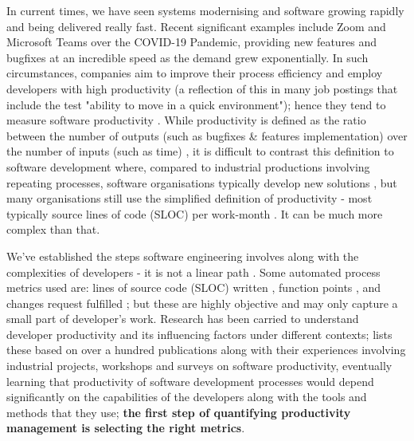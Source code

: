 \documentclass{mprop}
\begin{document}
In current times, we have seen systems modernising and software growing rapidly and being delivered really fast. Recent significant examples include Zoom and Microsoft Teams over the COVID-19 Pandemic, providing new features and bugfixes at an incredible speed as the demand grew exponentially. In such circumstances, companies aim to improve their process efficiency and employ developers with high productivity (a reflection of this in many job postings that include the test "ability to move in a quick environment"); hence they tend to measure software productivity \cite{devanbuAnalyticalEmpiricalEvaluation1996}. While productivity is defined as the ratio between the number of outputs (such as bugfixes \& features implementation) over the number of inputs (such as time) \cite{morisioFrameworkBasedSoftware1999,pritchard1995productivity}, it is difficult to contrast this definition to software development where, compared to industrial productions involving repeating processes, software organisations typically develop new solutions \cite{trendowiczChapterFactorsInfluencing2009}, but many organisations still use the simplified definition of productivity \cite{careyImpactCommunicationMode1997} - most typically source lines of code (SLOC) per work-month \cite{barry1981software,conteSoftwareEngineeringMetrics1986,jonesProgrammingProductivity1985}. It can be much more complex than that.

We've established the steps software engineering involves along with the complexities of developers - it is not a linear path \cite{abdel-hamidSlipperyPathProductivity1996,briand2002software,kemererEmpiricalValidationSoftware1987}. Some automated process metrics used are: lines of source code (SLOC) written \cite{devanbuAnalyticalEmpiricalEvaluation1996,walstonMethodProgrammingMeasurement1977}, function points \cite{albrecht1979measuring,computerstaffSoftwareMetricsGood1994}, and changes request fulfilled \cite{cataldoSociotechnicalCongruenceFramework2008,millerHowWasYour2021}; but these are highly objective and may only capture a small part of developer's work. Research has been carried to understand developer productivity and its influencing factors under different contexts; \textcite{trendowiczChapterFactorsInfluencing2009} lists these based on over a hundred publications along with their experiences involving industrial projects, workshops and surveys on software productivity, eventually learning that productivity of software development processes would depend significantly on the capabilities of the developers along with the tools and methods that they use; \textbf{the first step of quantifying productivity management is selecting the right metrics}.
\end{document}

